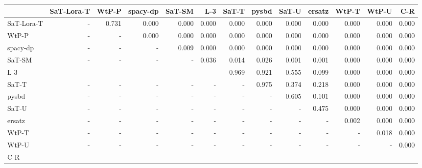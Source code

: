 \begin{tabular}{lrrrrrrrrrrrr}
\toprule
 & SaT-Lora-T & WtP-P & spacy-dp & SaT-SM & L-3 & SaT-T & pysbd & SaT-U & ersatz & WtP-T & WtP-U & C-R \\
\midrule
SaT-Lora-T & - & 0.731 & 0.000 & 0.000 & 0.000 & 0.000 & 0.000 & 0.000 & 0.000 & 0.000 & 0.000 & 0.000 \\
WtP-P & - & - & 0.000 & 0.000 & 0.000 & 0.000 & 0.000 & 0.000 & 0.000 & 0.000 & 0.000 & 0.000 \\
spacy-dp & - & - & - & 0.009 & 0.000 & 0.000 & 0.000 & 0.000 & 0.000 & 0.000 & 0.000 & 0.000 \\
SaT-SM & - & - & - & - & 0.036 & 0.014 & 0.026 & 0.001 & 0.001 & 0.000 & 0.000 & 0.000 \\
L-3 & - & - & - & - & - & 0.969 & 0.921 & 0.555 & 0.099 & 0.000 & 0.000 & 0.000 \\
SaT-T & - & - & - & - & - & - & 0.975 & 0.374 & 0.218 & 0.000 & 0.000 & 0.000 \\
pysbd & - & - & - & - & - & - & - & 0.605 & 0.101 & 0.000 & 0.000 & 0.000 \\
SaT-U & - & - & - & - & - & - & - & - & 0.475 & 0.000 & 0.000 & 0.000 \\
ersatz & - & - & - & - & - & - & - & - & - & 0.002 & 0.000 & 0.000 \\
WtP-T & - & - & - & - & - & - & - & - & - & - & 0.018 & 0.000 \\
WtP-U & - & - & - & - & - & - & - & - & - & - & - & 0.000 \\
C-R & - & - & - & - & - & - & - & - & - & - & - & - \\
\bottomrule
\end{tabular}

